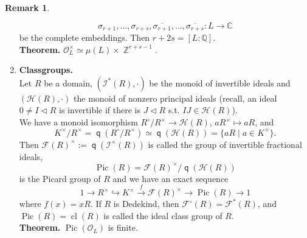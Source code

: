 \documentclass[12pt,a4paper]{report}
\theoremstyle{definition}
\newtheorem{Remark}[theorem]{Remark}
\theoremstyle{num.custom-title}
\DeclareMathOperator{\Z}{\mathbb{Z}}
\DeclareMathOperator{\Pic}{Pic}
\DeclareMathOperator{\cl}{cl}
\DeclareMathOperator{\q}{\mathsf{q}}
\newcommand{\ol}{\overline}
\newcommand{\C}{\mathbb{C}}
\newcommand{\F}{\mathcal{F}}
\newcommand{\I}{\mathcal{I}}
\newcommand{\Q}{\mathbb{Q}}
\renewcommand{\H}{\mathcal{H}}
\renewcommand{\O}{\mathcal{O}}
\begin{document}
\begin{Remark}
\begin{enumerate}
\[\sigma_{r+1},...,\sigma_{r+s}, \ol{\sigma_{r+1}},...,\ol{\sigma_{r+s}} : L \to \C
\]
be the complete embeddings. Then $r+2s = [L:\Q]$.\\
\textbf{Theorem.} $\O_L^\times \simeq \mu(L) \times \Z^{r+s-1}$.
\item \textbf{Classgroups.}\\
Let $R$ be a domain, $(\I^*(R),\cdot)$ be the monoid of invertible ideals and $(\H(R), \cdot)$ the monoid of nonzero principal ideals (recall, an ideal $0 \neq I \lhd R$ is invertible if there is $J \lhd R$ s.t. $IJ \in \H(R)$).\\
We have a monoid isomorphism $R^\circ/R^\times \to \H(R)$, $aR^\times \mapsto aR$, and 
\[
K^\times/R^\times = \q(R^\circ/R^\times) \simeq \q(\H(R)) = \{aR \mid a \in K^\times\}.
\]
Then $\F(R)^\times := \q(\I^\times(R))$ is called the group of invertible fractional ideals, 
\[
\Pic(R) = \F(R)^\times / \q(\H(R))
\]
is the Picard group of $R$ and we have an exact sequence
\[
1 \to R^\times \hookrightarrow K^\times \stackrel{f}{\to} \F(R)^\times \to \Pic(R) \to 1
\]
where $f(x)=xR$. If $R$ is Dedekind, then $\F^\circ(R)=\F^*(R)$, and $\Pic(R)=\cl(R)$ is called the ideal class group of $R$.\\
\textbf{Theorem.} $\Pic(\O_L)$ is finite.
\end{enumerate}
\end{Remark}
\end{document}
